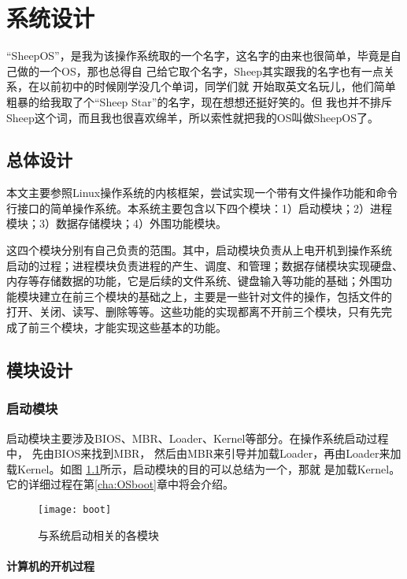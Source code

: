 \chapter{系统设计}

“SheepOS”，是我为该操作系统取的一个名字，这名字的由来也很简单，毕竟是自己做的一个OS，那也总得自
己给它取个名字，Sheep其实跟我的名字也有一点关系，在以前初中的时候刚学没几个单词，同学们就
开始取英文名玩儿，他们简单粗暴的给我取了个“Sheep Star”的名字，现在想想还挺好笑的。但
我也并不排斥Sheep这个词，而且我也很喜欢绵羊，所以索性就把我的OS叫做SheepOS了。

\section{总体设计}
\label{sec:overalldesign}

本文主要参照Linux操作系统的内核框架，尝试实现一个带有文件操作功能和命令
行接口的简单操作系统。本系统主要包含以下四个模块：1）启动模块；2）进程
模块；3）数据存储模块；4）外围功能模块。

这四个模块分别有自己负责的范围。其中，启动模块负责从上电开机到操作系统
启动的过程；进程模块负责进程的产生、调度、和管理；数据存储模块实现硬盘、
内存等存储数据的功能，它是后续的文件系统、键盘输入等功能的基础；外围功
能模块建立在前三个模块的基础之上，主要是一些针对文件的操作，包括文件的
打开、关闭、读写、删除等等。这些功能的实现都离不开前三个模块，只有先完
成了前三个模块，才能实现这些基本的功能。

\section{模块设计}

\subsection{启动模块}

启动模块主要涉及BIOS、MBR、Loader、Kernel等部分。在操作系统启动过程中，
先由BIOS来找到MBR，
然后由MBR来引导并加载Loader，再由Loader来加载Kernel。如图
\ref{fig:boot}所示，启动模块的目的可以总结为一个，那就
是加载Kernel。它的详细过程在第\ref{cha:OSboot}章中将会介绍。

\begin{figure}[H]
  \centering
  \texttt{[image: boot]}
  \caption{与系统启动相关的各模块}
  \label{fig:boot}
\end{figure}

\subsubsection{计算机的开机过程}


